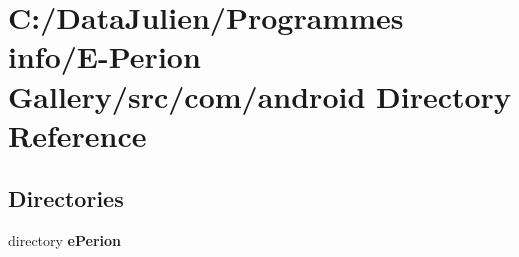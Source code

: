 \section{C\-:/\-Data\-Julien/\-Programmes info/\-E-\/\-Perion Gallery/src/com/android Directory Reference}
\label{dir_c8ae0c0fbb281293c9ca7ba94c5756fa}
\subsection*{Directories}
\begin{DoxyCompactItemize}
\item 
directory {\bf e\-Perion}
\end{DoxyCompactItemize}
